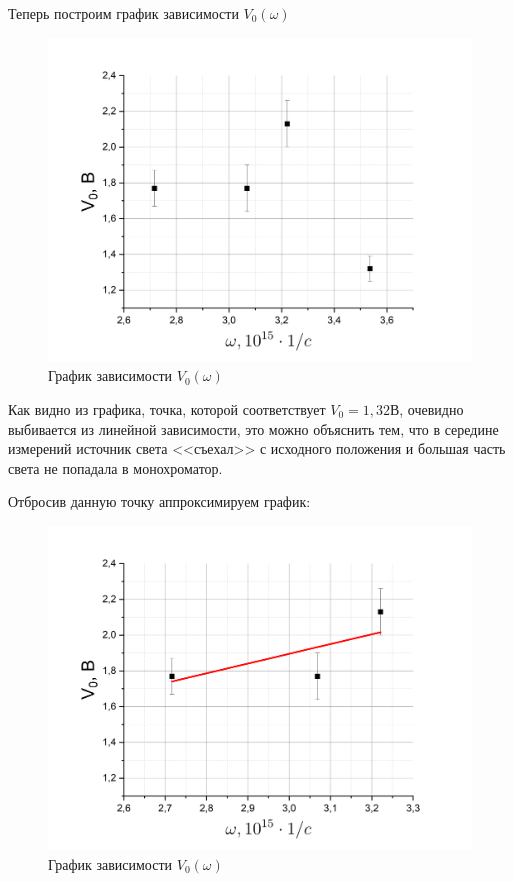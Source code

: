 \documentclass[a4paper,12pt]{article}
\begin{document}
Теперь построим график зависимости $V_0(\omega)$

\begin{figure}[h!]
	\centering
	\includegraphics[width = 0.8\linewidth]{Stopping_voltage}
	\caption{График зависимости $V_0(\omega)$}
	\label{graph6:stop_voltage}
\end{figure}

Как видно из графика, точка, которой соответствует $V_0 = 1,32 В$, очевидно выбивается из линейной зависимости, это можно объяснить тем, что в середине измерений источник света <<съехал>> с исходного положения и большая часть света не попадала в монохроматор.

Отбросив данную точку аппроксимируем график:

\pagebreak

\begin{figure}[h!]
	\centering
	\includegraphics[width = 0.8\linewidth]{Stopping_voltage_2}
	\caption{График зависимости $V_0(\omega)$}
	\label{graph7:stop_voltage_2}
\end{figure}
\end{document}
